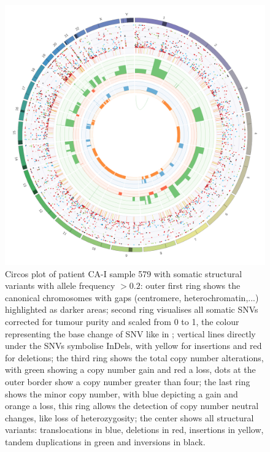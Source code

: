 \begin{figure}[ht]
\centering
\includegraphics[width=.99\linewidth]{Figures/CASCADE/CA51/CA51-579.circos.png}
\caption[Circos plot of patient CA-I sample 579]{Circos plot of patient CA-I sample 579 with somatic structural variants with allele frequency $> 0.2$: outer first ring shows the canonical chromosomes with gaps (centromere, heterochromatin,...) highlighted as darker areas; second ring visualises all somatic SNVs corrected for tumour purity and scaled from 0 to 1, the colour representing the base change of SNV like in \protect\textcite{Alexandrov2013}; vertical lines directly under the SNVs symbolise InDels, with yellow for insertions and red for deletions; the third ring shows the total copy number alterations, with green showing a copy number gain and red a loss, dots at the outer border show a copy number greater than four; the last ring shows the minor copy number, with blue depicting a gain and orange a loss, this ring allows the detection of copy number neutral changes, like loss of heterozygosity; the center shows all structural variants: translocations in blue, deletions in red, insertions in yellow, tandem duplications in green and inversions in black.} \label{fig:ca51.579circos}
\end{figure}


